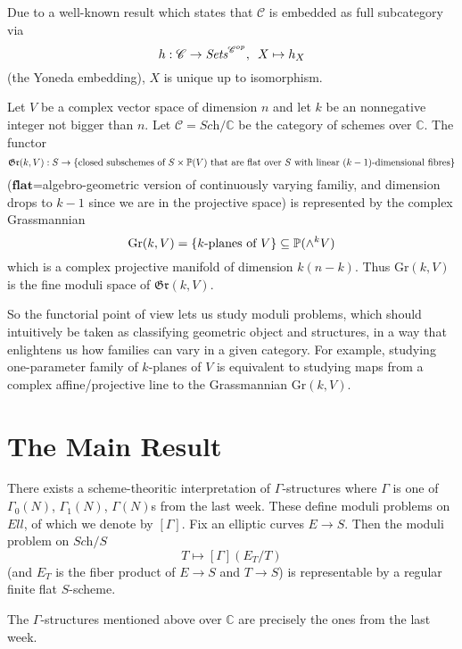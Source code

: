\documentclass[a4paper,11pt]{article}
\begin{document}
\begin{rem}
Due to a well-known result which states that $\mathcal{C}$ is embedded as full subcategory via
\[
h:\mathcal{C}\to\textit{Sets}^{\mathcal{C}^{op}}, \enskip X \mapsto h_X
\]
(the Yoneda embedding), $X$ is unique up to isomorphism.
\end{rem}

\begin{exm}
Let $V$ be a complex vector space of dimension $n$ and let $k$ be an nonnegative integer not bigger than $n$.
Let $\mathcal{C}=\textit{Sch}/\mathbb{C}$ be the category of schemes over $\mathbb{C}$.
The functor
\[
\mathfrak{Gr}(k,V):S\to\{\textnormal{closed subschemes of }S\times\mathbb{P}(V)\textnormal{ that are flat over $S$ with linear $(k-1)$-dimensional fibres}\}
\]
($\textbf{flat}$=algebro-geometric version of continuously varying familiy, and dimension drops to $k-1$ since we are in the projective space) is represented by the complex Grassmannian
\[
\textnormal{Gr}(k,V) = \{k\textnormal{-planes of }V\} \subseteq \mathbb{P}(\wedge^kV)
\]
which is a complex projective manifold of dimension $k(n-k)$.
Thus Gr$(k,V)$ is the fine moduli space of $\mathfrak{Gr}(k,V)$.
\end{exm}

So the functorial point of view lets us study moduli problems, which should intuitively be taken as classifying geometric object and structures, in a way that enlightens us how families can vary in a given category.
For example, studying one-parameter family of $k$-planes of $V$ is equivalent to studying maps from a complex affine/projective line to the Grassmannian Gr$(k,V)$.

\section{The Main Result}

\begin{thm}
There exists a scheme-theoritic interpretation of $\Gamma$-structures where $\Gamma$ is one of $\Gamma_0(N)$, $\Gamma_1(N)$, $\Gamma(N)$s from the last week.
These define moduli problems on $Ell$, of which we denote by $[\Gamma]$.
Fix an elliptic curves $E\to$$S$.
Then the moduli problem on $\textit{Sch}/S$
\[
T \mapsto [\Gamma](E_T/T)
\]
(and $E_T$ is the fiber product of $E\to$$S$ and $T\to$$S$) is representable by a regular finite flat $S$-scheme.
\end{thm}

\begin{rem}
The $\Gamma$-structures mentioned above over $\mathbb{C}$ are precisely the ones from the last week.
\end{rem}
\end{document}
